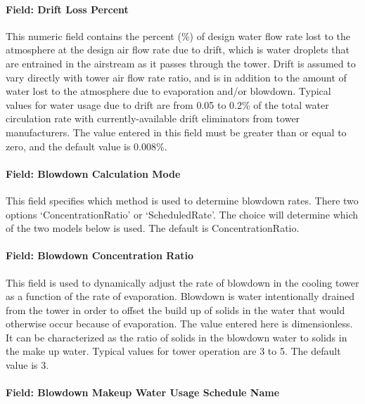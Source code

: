 \paragraph{Field: Drift Loss Percent}\label{field-drift-loss-percent-3}

This numeric field contains the percent (\%) of design water flow rate lost to the atmosphere at the design air flow rate due to drift, which is water droplets that are entrained in the airstream as it passes through the tower. Drift is assumed to vary directly with tower air flow rate ratio, and is in addition to the amount of water lost to the atmosphere due to evaporation and/or blowdown. Typical values for water usage due to drift are from 0.05 to 0.2\% of the total water circulation rate with currently-available drift eliminators from tower manufacturers. The value entered in this field must be greater than or equal to zero, and the default value is 0.008\%.

\paragraph{Field: Blowdown Calculation Mode}\label{field-blowdown-calculation-mode-3}

This field specifies which method is used to determine blowdown rates. There two options `ConcentrationRatio' or `ScheduledRate'. The choice will determine which of the two models below is used. The default is ConcentrationRatio.

\paragraph{Field: Blowdown Concentration Ratio}\label{field-blowdown-concentration-ratio-3}

This field is used to dynamically adjust the rate of blowdown in the cooling tower as a function of the rate of evaporation. Blowdown is water intentionally drained from the tower in order to offset the build up of solids in the water that would otherwise occur because of evaporation. The value entered here is dimensionless. It can be characterized as the ratio of solids in the blowdown water to solids in the make up water. Typical values for tower operation are 3 to 5. The default value is 3.

\paragraph{Field: Blowdown Makeup Water Usage Schedule Name}\label{field-blowdown-makeup-water-usage-schedule-name-3}


